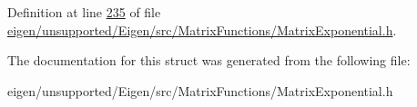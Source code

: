 Definition at line \hyperlink{eigen_2unsupported_2_eigen_2src_2_matrix_functions_2_matrix_exponential_8h_source_l00235}{235} of file \hyperlink{eigen_2unsupported_2_eigen_2src_2_matrix_functions_2_matrix_exponential_8h_source}{eigen/unsupported/\+Eigen/src/\+Matrix\+Functions/\+Matrix\+Exponential.\+h}.



The documentation for this struct was generated from the following file\+:\begin{DoxyCompactItemize}
\item 
eigen/unsupported/\+Eigen/src/\+Matrix\+Functions/\+Matrix\+Exponential.\+h\end{DoxyCompactItemize}
